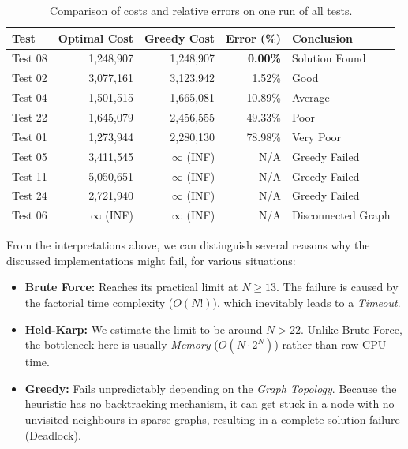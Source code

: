 \begin{table}[H]
    \centering
    \caption{Comparison of costs and relative errors on one run of all tests.} 
    \label{tab:accuracy}
    \begin{tabular}{|l|r|r|r|l|}
        \hline
        \textbf{Test} & \textbf{Optimal Cost} & \textbf{Greedy Cost} & \textbf{Error (\%)} & \textbf{Conclusion} \\
        \hline
        Test 08 & 1,248,907 & 1,248,907      & \textbf{0.00\%}  & Solution Found \\
        Test 02 & 3,077,161 & 3,123,942      & 1.52\%           & Good \\
        Test 04 & 1,501,515 & 1,665,081      & 10.89\%          & Average \\
        Test 22 & 1,645,079 & 2,456,555      & 49.33\%          & Poor \\
        Test 01 & 1,273,944 & 2,280,130      & 78.98\%          & Very Poor \\
        \hline
        Test 05 & 3,411,545 & $\infty$ (INF) & N/A              & Greedy Failed \\
        Test 11 & 5,050,651 & $\infty$ (INF) & N/A              & Greedy Failed \\
        Test 24 & 2,721,940 & $\infty$ (INF) & N/A              & Greedy Failed \\
        \hline
        Test 06 & $\infty$ (INF) & $\infty$ (INF) & N/A         & Disconnected Graph \\
        \hline
    \end{tabular}
\end{table}

From the interpretations above, we can distinguish several reasons why the discussed implementations might fail, for various situations:

\begin{itemize}
    \item \textbf{Brute Force:} Reaches its practical limit at $N \ge 13$. The failure is caused by the factorial time complexity ($O(N!)$), which inevitably leads to a \textit{Timeout}.
    \item \textbf{Held-Karp:} We estimate the limit to be around $N > 22$. Unlike Brute Force, the bottleneck here is usually \textit{Memory} ($O(N \cdot 2^N)$) rather than raw CPU time.  
    \item \textbf{Greedy:} Fails unpredictably depending on the \textit{Graph Topology}. Because the heuristic has no backtracking mechanism, it can get stuck in a node with no unvisited neighbours in sparse graphs, 
    resulting in a complete solution failure (Deadlock).
\end{itemize}

